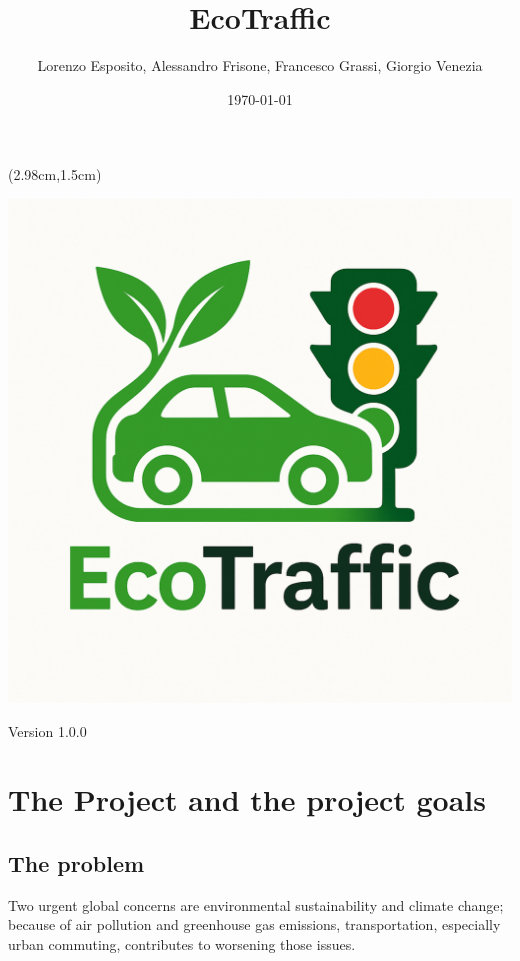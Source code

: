 \documentclass[12pt, a4paper, twoside, openright]{report}
\title{EcoTraffic}
\author{Lorenzo Esposito, Alessandro Frisone, Francesco Grassi, Giorgio Venezia}
\date{\today}
\begin{document}
\begin{textblock*}{\textwidth}(2.98cm,1.5cm)
  \begin{center}
    \includegraphics[scale=0.25]{images/EcoTraffic_logo.pdf}  
    \maketitle
    Version 1.0.0
  \end{center}  
\end{textblock*}


\blankpage

\tableofcontents
\afterpage{\blankpage}
\newpage
{}

\chapter{The Project and the project goals}
\section{The problem}
Two urgent global concerns are environmental sustainability and climate
change; because of air pollution and greenhouse gas emissions,
transportation, especially urban commuting, contributes to worsening
those issues.
\end{document}
